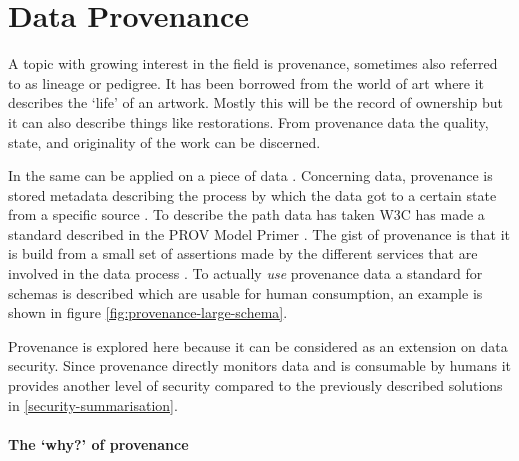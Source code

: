 \newcommand{\agent}{{\tt agent}}
\newcommand{\entity}{{\tt entity}}
\newcommand{\activity}{{\tt activity}}
\newcommand{\relation}{{\tt relation}}
\newcommand{\relations}{{\tt relations}}
\newcommand{\attributes}{{\tt attributes}}

\section{Data Provenance}
\label{datamodel-provenance}

A topic with growing interest in the \escience{} field is provenance, sometimes also referred to as lineage or pedigree.
It has been borrowed from the world of art where it describes the `life' of an artwork.
Mostly this will be the record of ownership but it can also describe things like restorations.
From provenance data the quality, state, and originality of the work can be discerned.

In \escience{} the same can be applied on a piece of data \cite{dsp4moreau}.
Concerning data, provenance is stored metadata describing the process by which the data got to a certain state from a specific source \cite{dsp4moreau,dsp2buneman}.
To describe the path data has taken W3C has made a standard described in the PROV Model Primer \cite{dsp8gil}.
The gist of provenance is that it is build from a small set of assertions made by the different services that are involved in  the data process \cite{dsp4moreau}.
To actually \emph{use} provenance data a standard for schemas is described which are usable for human consumption, an example is shown in figure \ref{fig:provenance-large-schema}.

Provenance is explored here because it can be considered as an extension on data security.
Since provenance directly monitors data and is consumable by humans it provides another level of security compared to the previously described solutions in \ref{security-summarisation}.


\paragraph{The `why?' of provenance}
\label{provenance-why}

